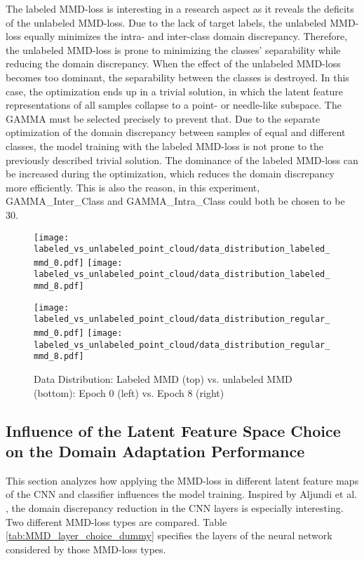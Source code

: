 The labeled MMD-loss is interesting in a research aspect as it reveals the deficits of the unlabeled MMD-loss. Due to the lack of target labels, the unlabeled MMD-loss equally minimizes the intra- and inter-class domain discrepancy. Therefore, the unlabeled MMD-loss is prone to minimizing the classes' separability while reducing the domain discrepancy. When the effect of the unlabeled MMD-loss becomes too dominant, the separability between the classes is destroyed. In this case, the optimization ends up in a trivial solution, in which the latent feature representations of all samples collapse to a point- or needle-like subspace. The GAMMA must be selected precisely to prevent that. Due to the separate optimization of the domain discrepancy between samples of equal and different classes, the model training with the labeled MMD-loss is not prone to the previously described trivial solution. The dominance of the labeled MMD-loss can be increased during the optimization, which reduces the domain discrepancy more efficiently. This is also the reason, in this experiment, GAMMA\_Inter\_Class and GAMMA\_Intra\_Class could both be chosen to be 30.


\begin{figure}[htp]
  \centering
  \texttt{[image: labeled\_vs\_unlabeled\_point\_cloud/data\_distribution\_labeled\_mmd\_0.pdf]}
  \hspace{.4cm}
  \texttt{[image: labeled\_vs\_unlabeled\_point\_cloud/data\_distribution\_labeled\_mmd\_8.pdf]}

  \vspace{.1cm}

  \texttt{[image: labeled\_vs\_unlabeled\_point\_cloud/data\_distribution\_regular\_mmd\_0.pdf]}
  \hspace{.4cm}
  \texttt{[image: labeled\_vs\_unlabeled\_point\_cloud/data\_distribution\_regular\_mmd\_8.pdf]}
  
  \caption{Data Distribution: Labeled MMD (top) vs. unlabeled MMD (bottom): Epoch 0 (left) vs. Epoch 8 (right)}
  \label{fig:point_cloud_labeled_unlabeled_mmd}
\end{figure}

\subsection{Influence of the Latent Feature Space Choice on the Domain Adaptation Performance}
\label{cnn_mmd_dummy}

This section analyzes how applying the MMD-loss in different latent feature maps of the CNN and classifier influences the model training. Inspired by Aljundi et al. \cite{Aljundi2016}, the domain discrepancy reduction in the CNN layers is especially interesting. Two different MMD-loss types are compared. Table \ref{tab:MMD_layer_choice_dummy} specifies the layers of the neural network considered by those MMD-loss types.

